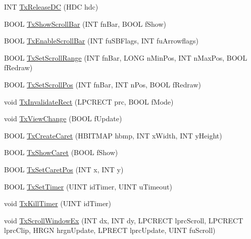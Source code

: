 \begin{DoxyCompactItemize}
\item 
I\-N\-T \hyperlink{class_c_formatted_text_draw_a583a4401f0c1d5a3e5bf02c6a0cfedbd}{Tx\-Release\-D\-C} (H\-D\-C hdc)
\item 
B\-O\-O\-L \hyperlink{class_c_formatted_text_draw_a8b31bc8979880017bac423fc7861e3c4}{Tx\-Show\-Scroll\-Bar} (I\-N\-T fn\-Bar, B\-O\-O\-L f\-Show)
\item 
B\-O\-O\-L \hyperlink{class_c_formatted_text_draw_af376f10597fba86173093d88ef231c72}{Tx\-Enable\-Scroll\-Bar} (I\-N\-T fu\-S\-B\-Flags, I\-N\-T fu\-Arrowflags)
\item 
B\-O\-O\-L \hyperlink{class_c_formatted_text_draw_af1539757775ca0235713e93f42274553}{Tx\-Set\-Scroll\-Range} (I\-N\-T fn\-Bar, L\-O\-N\-G n\-Min\-Pos, I\-N\-T n\-Max\-Pos, B\-O\-O\-L f\-Redraw)
\item 
B\-O\-O\-L \hyperlink{class_c_formatted_text_draw_abfad442af7f3e31dc59b6abc23c789a4}{Tx\-Set\-Scroll\-Pos} (I\-N\-T fn\-Bar, I\-N\-T n\-Pos, B\-O\-O\-L f\-Redraw)
\item 
void \hyperlink{class_c_formatted_text_draw_afe30ef4cb3f37c9875ca64a3484e8af3}{Tx\-Invalidate\-Rect} (L\-P\-C\-R\-E\-C\-T prc, B\-O\-O\-L f\-Mode)
\item 
void \hyperlink{class_c_formatted_text_draw_abdb3f55080c4bc55d7710059beb9e6d4}{Tx\-View\-Change} (B\-O\-O\-L f\-Update)
\item 
B\-O\-O\-L \hyperlink{class_c_formatted_text_draw_a14b064dc9ea9d0e12fb49355756339df}{Tx\-Create\-Caret} (H\-B\-I\-T\-M\-A\-P hbmp, I\-N\-T x\-Width, I\-N\-T y\-Height)
\item 
B\-O\-O\-L \hyperlink{class_c_formatted_text_draw_ab2559df2077f47c4483ba526727016e2}{Tx\-Show\-Caret} (B\-O\-O\-L f\-Show)
\item 
B\-O\-O\-L \hyperlink{class_c_formatted_text_draw_a0de9d25f5f37cb97c45323f8ebaff5a1}{Tx\-Set\-Caret\-Pos} (I\-N\-T x, I\-N\-T y)
\item 
B\-O\-O\-L \hyperlink{class_c_formatted_text_draw_a2cfee5142c0ccc914ab9e22be37021a1}{Tx\-Set\-Timer} (U\-I\-N\-T id\-Timer, U\-I\-N\-T u\-Timeout)
\item 
void \hyperlink{class_c_formatted_text_draw_acea0cb499a41c7a3b8471ccae713d0a2}{Tx\-Kill\-Timer} (U\-I\-N\-T id\-Timer)
\item 
void \hyperlink{class_c_formatted_text_draw_ab86cfe0bd348ba7e6dca937139bf594b}{Tx\-Scroll\-Window\-Ex} (I\-N\-T dx, I\-N\-T dy, L\-P\-C\-R\-E\-C\-T lprc\-Scroll, L\-P\-C\-R\-E\-C\-T lprc\-Clip, H\-R\-G\-N hrgn\-Update, L\-P\-R\-E\-C\-T lprc\-Update, U\-I\-N\-T fu\-Scroll)

\end{DoxyCompactItemize}
